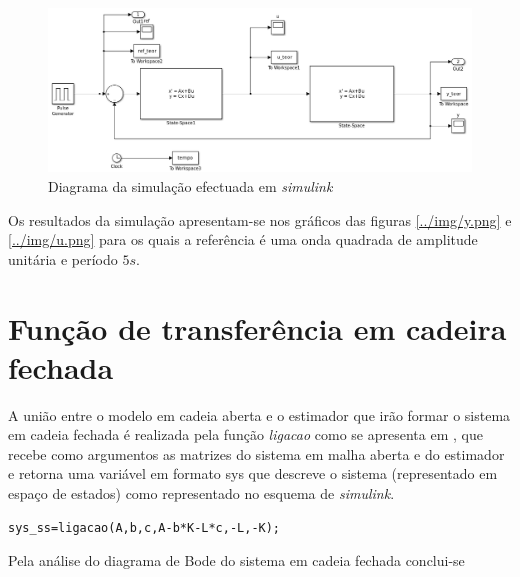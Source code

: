 \documentclass[%
  reprint,
  nofootinbib,
  amsmath,amssymb,
  aps,
  10pt,
  a4paper
]{revtex4-1}
\begin{document}
\begin{figure}[t]
  \includegraphics[width=.6\textheight]{../img/simulink.png}%
  \caption{\label{../img/simulink.png} Diagrama da simulação efectuada em {\it simulink}}
\end{figure}


Os resultados da simulação apresentam-se nos gráficos das figuras \ref{../img/y.png} e \ref{../img/u.png} para os quais a referência é uma onda quadrada de amplitude unitária e período $5s$.

\section{Função de transferência em cadeira fechada}
\label{CF}	
A união entre o modelo em cadeia aberta e o estimador que irão formar o sistema em cadeia fechada é realizada pela função {\it ligacao} como se apresenta em , que recebe como argumentos as matrizes do sistema em malha aberta e do estimador e retorna uma variável em formato sys que descreve o sistema (representado em espaço de estados) como representado no esquema de {\it simulink}.


\begin{lstlisting}[label=list3, caption={Código Matlab para a obtensão do sistema em cadeira fechada. A função {\it ligacao} apresenta-se em anexo no ficheiro com o mesmo nome.}]
sys_ss=ligacao(A,b,c,A-b*K-L*c,-L,-K);
\end{lstlisting}

Pela análise do diagrama de Bode do sistema em cadeia fechada conclui-se 
\end{document}
